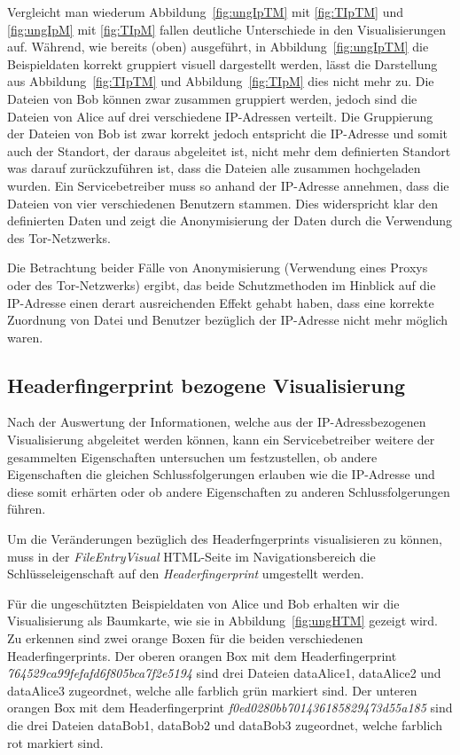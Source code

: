 \documentclass[
    fontsize=12pt,
    headings=small,
    parskip=half,           %
    bibliography=totoc,
    numbers=noenddot,       %
    open=any,               %
    ]{scrreprt}
\begin{document}
Vergleicht man wiederum Abbildung~\ref{fig:ungIpTM} mit \ref{fig:TIpTM} und \ref{fig:ungIpM} mit \ref{fig:TIpM} fallen deutliche Unterschiede in den Visualisierungen auf. 
Während, wie bereits (oben) ausgeführt, in Abbildung~\ref{fig:ungIpTM} die Beispieldaten korrekt gruppiert visuell dargestellt werden,
lässt die Darstellung aus Abbildung~\ref{fig:TIpTM} und Abbildung~\ref{fig:TIpM} dies nicht mehr zu.
Die Dateien von Bob können zwar zusammen gruppiert werden, jedoch sind die Dateien von Alice auf drei verschiedene IP-Adressen verteilt.
Die Gruppierung der Dateien von Bob ist zwar korrekt jedoch entspricht die IP-Adresse und somit auch der Standort, der daraus abgeleitet ist, nicht mehr dem definierten Standort was darauf zurückzuführen ist, dass die Dateien alle zusammen hochgeladen wurden.
Ein Servicebetreiber muss so anhand der IP-Adresse annehmen, dass die Dateien von vier verschiedenen Benutzern stammen.
Dies widerspricht klar den definierten Daten und zeigt die Anonymisierung der Daten durch die Verwendung des Tor-Netzwerks.

Die Betrachtung beider Fälle von Anonymisierung (Verwendung eines Proxys oder des Tor-Netzwerks) ergibt, das beide Schutzmethoden im Hinblick auf die IP-Adresse einen derart ausreichenden Effekt gehabt haben, dass eine korrekte Zuordnung von Datei und Benutzer bezüglich der IP-Adresse nicht mehr möglich waren.

\subsection{Headerfingerprint bezogene Visualisierung}
Nach der Auswertung der Informationen, welche aus der IP-Adressbezogenen Visualisierung abgeleitet werden können, kann ein Servicebetreiber weitere der gesammelten Eigenschaften untersuchen um festzustellen, ob andere Eigenschaften die gleichen Schlussfolgerungen erlauben wie die IP-Adresse und diese somit erhärten oder ob andere Eigenschaften zu anderen Schlussfolgerungen führen.

Um die Veränderungen bezüglich des Headerfngerprints visualisieren zu können, muss in der \textit{FileEntryVisual} HTML-Seite im Navigationsbereich die Schlüsseleigenschaft auf den \textit{Headerfingerprint} umgestellt werden.

Für die ungeschützten Beispieldaten von Alice und Bob erhalten wir die Visualisierung als Baumkarte, wie sie in  Abbildung~\ref{fig:ungHTM} gezeigt wird.
Zu erkennen sind zwei orange Boxen für die beiden verschiedenen Headerfingerprints.
Der oberen orangen Box mit dem Headerfingerprint \textit{764529ca99fefafd6f805bca7f2e5194} sind drei Dateien dataAlice1, dataAlice2 und dataAlice3 zugeordnet, welche alle farblich grün markiert sind.
Der unteren orangen Box mit dem Headerfingerprint  \textit{f0ed0280bb701436185829473d55a185} sind die drei Dateien dataBob1, dataBob2 und dataBob3 zugeordnet, welche farblich rot markiert sind.
\end{document}
